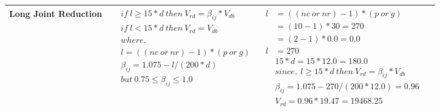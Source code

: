 \documentclass{article}%
\begin{document}
\begin{longtable}{|p{4cm}|p{5cm}|p{5.5cm}|p{1.5cm}|}
\hline%
Long Joint Reduction&$\begin{aligned} &if~l\geq 15 * d~then~V_{rd} = \beta_{ij} * V_{db} \\ & if~l < 15 * d~then~V_{rd} = V_{db} \\ & where,\\ & l = ((nc~or~nr) - 1) * (p~or~g) \\ & \beta_{ij} = 1.075 - l/(200 * d) \\ & but~0.75\leq\beta_{ij}\leq1.0 \end{aligned}$&$\begin{aligned} l&= ((nc~or~nr) - 1) * (p~or~g) \\  &= (10 - 1) * 30=270\\  &= (2 - 1) * 0.0=0.0\\  l&= 270\\ & 15 * d = 15 * 12.0 = 180.0 \\ & since,~l \geq 15 * d~then~V_{rd} = \beta_{ij} * V_{db} \\ & \beta_{ij} = 1.075 - 270/(200*12.0) =0.96\\ & V_{rd} = 0.96 * 19.47=19468.25 \end{aligned}$&\\%
\hline%
\end{longtable}

%
\newpage%
\end{document}
